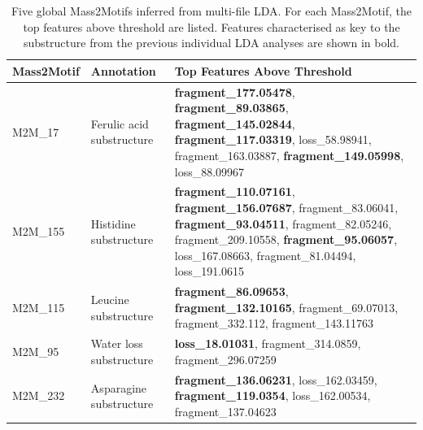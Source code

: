 \begin{table}[!tbhp]
\small
\centering
\begin{tabular}{|l|l|p{3.8cm}|}
\hline
Mass2Motif & Annotation                & Top Features Above Threshold                                                                                                                                                                           \\ \hline
M2M\_17           & Ferulic acid substructure & \textbf{fragment\_177.05478}, \textbf{fragment\_89.03865}, \textbf{fragment\_145.02844}, \textbf{fragment\_117.03319}, loss\_58.98941, \newline fragment\_163.03887, \textbf{fragment\_149.05998}, loss\_88.09967 \\ \hline
M2M\_155          & Histidine substructure    & \textbf{fragment\_110.07161}, \textbf{fragment\_156.07687}, fragment\_83.06041, \textbf{fragment\_93.04511}, fragment\_82.05246, fragment\_209.10558, \textbf{fragment\_95.06057}, loss\_167.08663, fragment\_81.04494, loss\_191.0615 \\ \hline
M2M\_115          & Leucine substructure      & \textbf{fragment\_86.09653}, \textbf{fragment\_132.10165}, fragment\_69.07013, fragment\_332.112, fragment\_143.11763 \\ \hline
M2M\_95           & Water loss substructure   & \textbf{loss\_18.01031}, \newline fragment\_314.0859, \newline fragment\_296.07259                                                                                                              \\ \hline
M2M\_232          & Asparagine substructure   & \textbf{fragment\_136.06231}, loss\_162.03459, \textbf{fragment\_119.0354}, loss\_162.00534, \newline fragment\_137.04623 \\ \hline
\end{tabular}
\caption[Five global Mass2Motifs inferred from multi-file LDA.]{Five global Mass2Motifs inferred from multi-file LDA. For each Mass2Motif, the top features above threshold are listed. Features characterised as key to the substructure from the previous individual LDA analyses are shown in bold.}
\label{tab:multifile-results}
\end{table}

